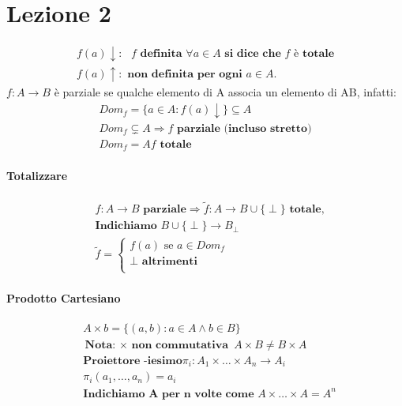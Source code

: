 \documentclass{article}
\begin{document}
\section{Lezione 2}
\begin{displaymath}
    \begin{split}
        f(a)\downarrow: \textbf{ $f$ definita } \forall a \in A \textbf{ si dice che $f$ è totale}\\
        f(a)\uparrow: \textbf{ non definita per ogni } a \in A.
    \end{split}
\end{displaymath}
$f:A \rightarrow B$ è parziale se qualche elemento di A associa un elemento di AB, infatti:
\begin{displaymath}
    \begin{split}
        Dom_f=\{a \in A: f(a) \downarrow \} \subseteq A\\
        Dom_f \subsetneq A \Rightarrow f \textbf{ parziale (incluso stretto)}\\
        Dom_f = A f \textbf{ totale}
    \end{split}
\end{displaymath}
\paragraph{Totalizzare}
\begin{displaymath}
    \begin{split}
        &f:A \rightarrow B \textbf{ parziale} \Rightarrow \tilde{f}:A \rightarrow B \cup \{\perp \} \textbf{ totale,}\\
        &\textbf{Indichiamo } B \cup \{ \perp \} \rightarrow B_{\perp}\\
        &\tilde{f}=
        \begin{cases}
            f(a) \text{ se } a \in Dom_f\\
            \perp \textbf{ altrimenti} \\
        \end{cases}
    \end{split}
\end{displaymath}

\paragraph{Prodotto Cartesiano}
\begin{displaymath}
    \begin{split}
        &A \times b = \{(a,b): a \in A \wedge b \in B \}\\
        &\textbf{Nota: $\times$ non commutativa }A \times B \neq B \times A\\ 
        &\textbf{Proiettore -iesimo} \pi_i:A_1 \times \dots \times A_n \rightarrow A_i \\
        &\pi_i(a_1, \dots, a_n)=a_i \\
        &\textbf{Indichiamo A per n volte come } A \times \dots \times A = A^n
    \end{split}
\end{displaymath}
\end{document}
